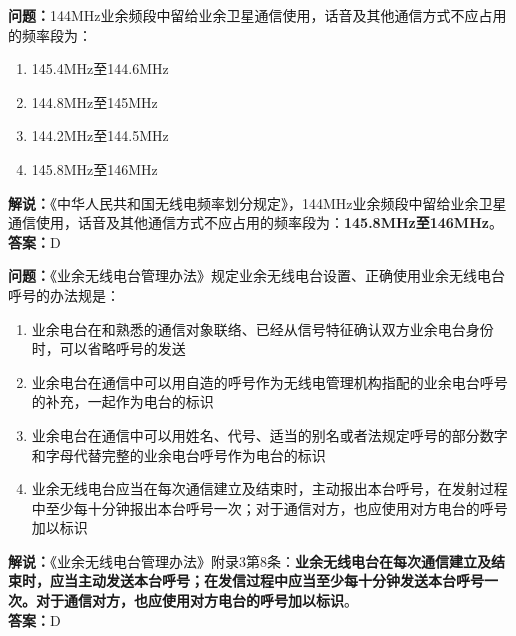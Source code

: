 \bigskip


\noindent\textbf{问题：}144MHz业余频段中留给业余卫星通信使用，话音及其他通信方式不应占用的频率段为：
\begin{enumerate}[label=\Alph*), leftmargin=3em]
  \item 145.4MHz至144.6MHz
  \item 144.8MHz至145MHz
  \item 144.2MHz至144.5MHz
  \item 145.8MHz至146MHz
\end{enumerate}
\noindent\textbf{解说：}《中华人民共和国无线电频率划分规定》，144MHz业余频段中留给业余卫星通信使用，话音及其他通信方式不应占用的频率段为：\textbf{145.8MHz至146MHz}。\\\noindent\textbf{答案：}D



\bigskip


\noindent\textbf{问题：}《业余无线电台管理办法》规定业余无线电台设置、正确使用业余无线电台呼号的办法规是：
\begin{enumerate}[label=\Alph*), leftmargin=3em]
	\item 业余电台在和熟悉的通信对象联络、已经从信号特征确认双方业余电台身份时，可以省略呼号的发送
	\item 业余电台在通信中可以用自造的呼号作为无线电管理机构指配的业余电台呼号的补充，一起作为电台的标识
	\item 业余电台在通信中可以用姓名、代号、适当的别名或者法规定呼号的部分数字和字母代替完整的业余电台呼号作为电台的标识
	\item 业余无线电台应当在每次通信建立及结束时，主动报出本台呼号，在发射过程中至少每十分钟报出本台呼号一次；对于通信对方，也应使用对方电台的呼号加以标识
\end{enumerate}
\noindent\textbf{解说：}《业余无线电台管理办法》附录3第8条：\textbf{业余无线电台在每次通信建立及结束时，应当主动发送本台呼号；在发信过程中应当至少每十分钟发送本台呼号一次。对于通信对方，也应使用对方电台的呼号加以标识}。\\\noindent\textbf{答案：}D



\bigskip


